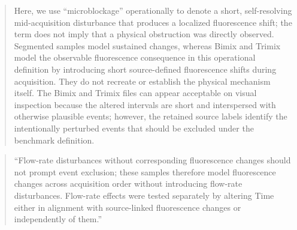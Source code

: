 \documentclass[
  11pt,
  a4paper,
]{article}
\begin{document}
\begin{quote}
Here, we use ``microblockage'' operationally to denote a short,
self-resolving mid-acquisition disturbance that produces a localized
fluorescence shift; the term does not imply that a physical obstruction
was directly observed. Segmented samples model sustained changes,
whereas Bimix and Trimix model the observable fluorescence consequence
in this operational definition by introducing short source-defined
fluorescence shifts during acquisition. They do not recreate or
establish the physical mechanism itself. The Bimix and Trimix files can
appear acceptable on visual inspection because the altered intervals are
short and interspersed with otherwise plausible events; however, the
retained source labels identify the intentionally perturbed events that
should be excluded under the benchmark definition.
\end{quote}

\begin{quote}
``Flow-rate disturbances without corresponding fluorescence changes
should not prompt event exclusion; these samples therefore model
fluorescence changes across acquisition order without introducing
flow-rate disturbances. Flow-rate effects were tested separately by
altering Time either in alignment with source-linked fluorescence
changes or independently of them.''
\end{quote}
\end{document}
